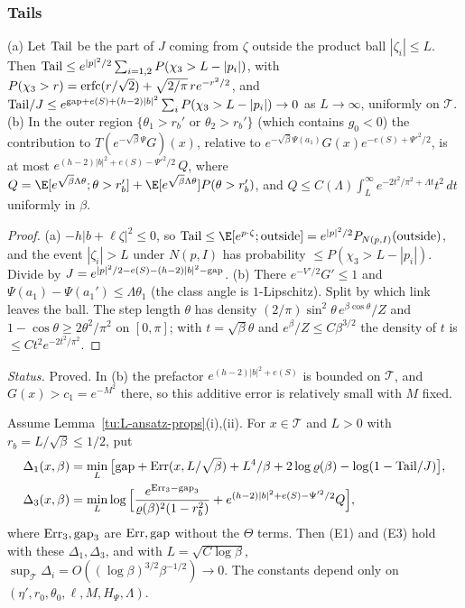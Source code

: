 \subsubsection*{Tails}

\begin{lemma}\label{tu:L-tails}
(a) Let ${\rm Tail}$ be the part of $J$ coming from $\zeta$ outside the product ball $|\zeta_i|\le L$. Then
${\rm Tail}\le e^{|p|^2/2}\sum_{i=1,2}P(\chi_3>L-|p_i|)$, with
$P(\chi_3>r)={\rm erfc}(r/\sqrt2)+\sqrt{2/\pi}\,re^{-r^2/2}$, and
${\rm Tail}/J\le e^{{\rm gap}+e(S)+(h-2)|b|^2}\sum_iP(\chi_3>L-|p_i|)\to0$ as $L\to\infty$, uniformly on $\mathcal T$.
(b) In the outer region $\{\theta_1>r_b'\text{ or }\theta_2>r_b'\}$ (which contains $g_0<0$) the contribution
to $T(e^{-\sqrt\beta\Psi}G)(x)$, relative to $e^{-\sqrt\beta\Psi(a_1)}G(x)e^{-e(S)+\Psi'^2/2}$, is at most
$e^{(h-2)|b|^2+e(S)-\Psi'^2/2}\,Q$, where
$Q=\E[e^{\sqrt\beta\Lambda\theta};\theta>r_b']+\E[e^{\sqrt\beta\Lambda\theta}]P(\theta>r_b')$, and
$Q\le C(\Lambda)\int_L^\infty e^{-2t^2/\pi^2+\Lambda t}t^2\,dt$ uniformly in $\beta$.
\end{lemma}

\begin{proof}
(a) $-h|b+\ell\zeta|^2\le0$, so ${\rm Tail}\le\E[e^{p\cdot\zeta};\text{outside}]=e^{|p|^2/2}P_{N(p,I)}(\text{outside})$, and
the event $|\zeta_i|>L$ under $N(p,I)$ has probability $\le P(\chi_3>L-|p_i|)$. Divide by
$J=e^{|p|^2/2-e(S)-(h-2)|b|^2-{\rm gap}}$.
(b) There $e^{-V'/2}G'\le1$ and $\Psi(a_1)-\Psi(a_1')\le\Lambda\theta_1$ (the class angle is $1$-Lipschitz). Split
by which link leaves the ball. The step length $\theta$ has density $(2/\pi)\sin^2\theta\,e^{\beta\cos\theta}/Z$ and
$1-\cos\theta\ge2\theta^2/\pi^2$ on $[0,\pi]$; with $t=\sqrt\beta\theta$ and $e^\beta/Z\le C\beta^{3/2}$ the density of $t$
is $\le Ct^2e^{-2t^2/\pi^2}$.
\end{proof}

\noindent\emph{Status.} Proved. In (b) the prefactor $e^{(h-2)|b|^2+e(S)}$ is bounded on $\mathcal T$, and
$G(x)>c_1=e^{-M^2}$ there, so this additive error is relatively small with $M$ fixed.

\begin{proposition}[(E1) and (E3)]\label{tu:L-E13}
Assume Lemma~\ref{tu:L-ansatz-props}(i),(ii). For $x\in\mathcal T$ and $L>0$ with $r_b=L/\sqrt\beta\le1/2$, put
\begin{align*}
\Delta_1(x,\beta)&=\min_L\big[{\rm gap}+{\rm Err}(x,L/\sqrt\beta)+L^4/\beta+2\log\varrho(\beta)-\log(1-{\rm Tail}/J)\big],\\
\Delta_3(x,\beta)&=\min_L\log\Big[\frac{e^{{\rm Err}_3-{\rm gap}_3}}{\varrho(\beta)^2(1-r_b^2)}+e^{(h-2)|b|^2+e(S)-\Psi'^2/2}Q\Big],
\end{align*}
where ${\rm Err}_3,{\rm gap}_3$ are ${\rm Err},{\rm gap}$ without the $\Theta$ terms. Then (E1) and (E3) hold
with these $\Delta_1,\Delta_3$, and with $L=\sqrt{C\log\beta}$,
$\sup_{\mathcal T}\Delta_i=O((\log\beta)^{3/2}\beta^{-1/2})\to0$. The constants depend only on
$(\eta',r_0,\theta_0,\ell,M,H_\Psi,\Lambda)$.
\end{proposition}

